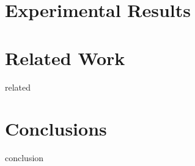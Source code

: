 \documentclass{sig-alternate}
\begin{document}
\section{Experimental Results}
\label{sec:results}


\section{Related Work}
\label{sec:related}
 {related}

\section{Conclusions}
\label{sec:conclusion}
 {conclusion}


{ 


}
\end{document}
